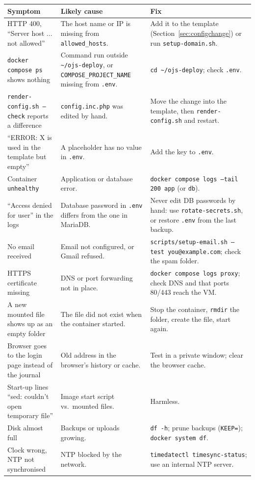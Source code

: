 \documentclass[11pt,a4paper]{report}
\newcommand{\code}[1]{\texttt{\small #1}}
\newcommand{\file}[1]{\texttt{\small #1}}
\begin{document}
\begin{longtable}{@{}P{4.2cm}P{4.6cm}P{6.6cm}@{}}
\toprule
\textbf{Symptom} & \textbf{Likely cause} & \textbf{Fix} \\
\midrule
\endhead
\bottomrule
\endfoot
HTTP 400, ``Server host ... not allowed'' & The host name or IP is missing from \code{allowed\_hosts}. & Add it to the template (Section~\ref{sec:configchange}) or run \file{setup-domain.sh}. \\
\code{docker compose ps} shows nothing & Command run outside \file{\textasciitilde/ojs-deploy}, or \code{COMPOSE\_PROJECT\_NAME} missing from \file{.env}. & \code{cd \textasciitilde/ojs-deploy}; check \file{.env}. \\
\code{render-config.sh --check} reports a difference & \file{config.inc.php} was edited by hand. & Move the change into the template, then \code{render-config.sh} and restart. \\
``ERROR: X is used in the template but empty'' & A placeholder has no value in \file{.env}. & Add the key to \file{.env}. \\
Container \code{unhealthy} & Application or database error. & \code{docker compose logs --tail 200 app} (or \code{db}). \\
``Access denied for user'' in the logs & Database password in \file{.env} differs from the one in MariaDB. & Never edit DB passwords by hand: use \file{rotate-secrets.sh}, or restore \file{.env} from the last backup. \\
No email received & Email not configured, or Gmail refused. & \code{scripts/setup-email.sh --test you@example.com}; check the spam folder. \\
HTTPS certificate missing & DNS or port forwarding not in place. & \code{docker compose logs proxy}; check DNS and that ports 80/443 reach the VM. \\
A new mounted file shows up as an empty folder & The file did not exist when the container started. & Stop the container, \code{rmdir} the folder, create the file, start again. \\
Browser goes to the login page instead of the journal & Old address in the browser's history or cache. & Test in a private window; clear the browser cache. \\
Start-up lines ``sed: couldn't open temporary file'' & Image start script vs.\ mounted files. & Harmless. \\
Disk almost full & Backups or uploads growing. & \code{df -h}; prune backups (\code{KEEP=}); \code{docker system df}. \\
Clock wrong, NTP not synchronised & NTP blocked by the network. & \code{timedatectl timesync-status}; use an internal NTP server. \\
\end{longtable}
\end{document}
